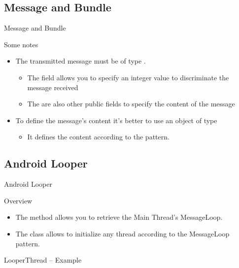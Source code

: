 \documentclass{beamer}
\begin{document}
\subsection*{Message and Bundle}
  \begin{frame}{Message and Bundle}
    \begin{block}{Some notes}
      \begin{itemize}
        \item The transmitted message must be of type .
        \begin{itemize}
          \item The  field allows you to specify an integer value to
          discriminate the message received
          \item The are also other public fields to specify the content of the
          message 
        \end{itemize} 
        {\vspace{10pt}}
        \item To define the message's content it's better to use an object of type
        \begin{itemize}
          \item It defines the content according to the  pattern.
        \end{itemize}
      \end{itemize}
    \end{block}
  \end{frame}

\subsection{Android Looper}
  \begin{frame}[fragile]{Android Looper}
    \begin{block}{Overview}
      \begin{itemize}
        \item The  method allows you to retrieve
        the Main Thread's MessageLoop. 
        \item The  class allows to initialize any thread according
        to the MessageLoop pattern.
      \end{itemize}
    \end{block}

    \begin{exampleblock}{LooperThread -- Example}
      
    \end{exampleblock}
  \end{frame}
\end{document}
